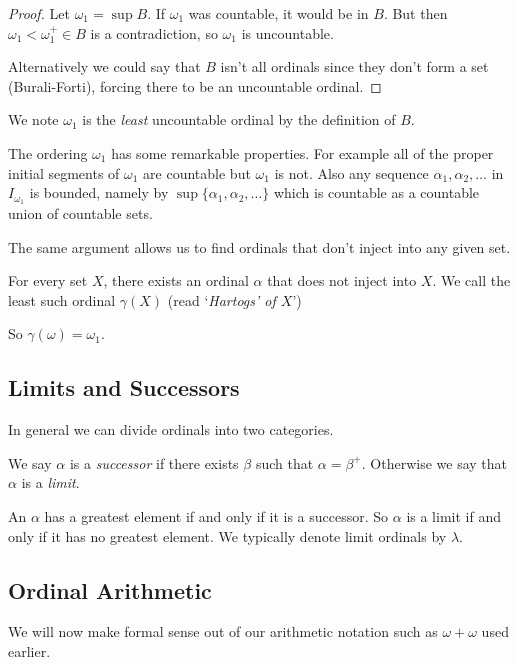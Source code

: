 \documentclass[a3paper, 10pt]{article}
\renewcommand{\vocab}[1]{\emph{#1}}
\begin{document}
\begin{multicols*}{5}
\begin{proof}
  Let $\omega_1 = \sup B$. If $\omega_1$ was countable, it would be in $B$. But then $\omega_1 < \omega_1^+ \in B$ is a contradiction, so $\omega_1$ is uncountable.


  Alternatively we could say that $B$ isn't all ordinals since they don't form a set (Burali-Forti), forcing there to be an uncountable ordinal. 
\end{proof}
We note $\omega_1$ is the \emph{least} uncountable ordinal by the definition of $B$.

The ordering $\omega_1$ has some remarkable properties. For example all of the proper initial segments of $\omega_1$ are countable but $\omega_1$ is not. Also any sequence $\alpha_1, \alpha_2, \dots$ in $I_{\omega_1}$ is bounded, namely by $\sup\{\alpha_1, \alpha_2, \dots\}$ which is countable as a countable union of countable sets.

The same argument allows us to find ordinals that don't inject into any given set.
\begin{theorem}
  For every set $X$, there exists an ordinal $\alpha$ that does not inject into $X$. We call the least such ordinal $\gamma(X)$ (read `\vocab{Hartogs' of $X$}')
\end{theorem}

So $\gamma(\omega) = \omega_1$.


\subsection{Limits and Successors}
In general we can divide ordinals into two categories.

\begin{definition}
  We say $\alpha$ is a \vocab{successor} if there exists $\beta$ such that $\alpha = \beta^+$. Otherwise we say that $\alpha$ is a \vocab{limit}.
\end{definition}

An $\alpha$ has a greatest element if and only if it is a successor. So $\alpha$ is a limit if and only if it has no greatest element. We typically denote limit ordinals by $\lambda$. 

\subsection{Ordinal Arithmetic}

We will now make formal sense out of our arithmetic notation such as $\omega + \omega$ used earlier.


\end{multicols*}
\end{document}
